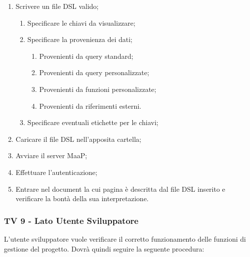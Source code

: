 \begin{enumerate}
\item Scrivere un file DSL valido;
\begin{enumerate}
\item Specificare le chiavi da visualizzare;
\item Specificare la provenienza dei dati;
\begin{enumerate}
\item Provenienti da query standard;
\item Provenienti da query personalizzate;
\item Provenienti da funzioni personalizzate;
\item Provenienti da riferimenti esterni.
\end{enumerate}
\item Specificare eventuali etichette per le chiavi;
\end{enumerate}
\item Caricare il file DSL nell'apposita cartella;
\item Avviare il server MaaP;
\item Effettuare l'autenticazione;
\item Entrare nel document la cui pagina è descritta dal file DSL inserito e verificare la bontà della sua interpretazione.
\end{enumerate}


\subsubsection{TV 9 - Lato Utente Sviluppatore}

L'utente sviluppatore vuole verificare il corretto funzionamento delle funzioni di gestione del progetto.
Dovrà quindi seguire la seguente procedura:

